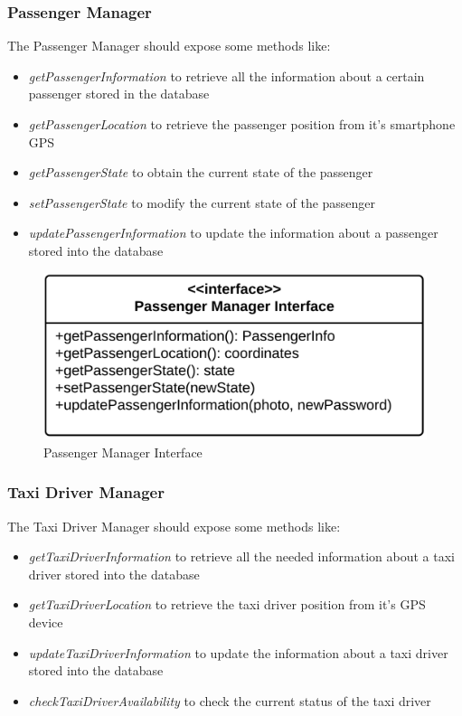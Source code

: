 \subsubsection{Passenger Manager}
The Passenger Manager should expose some methods like:
\begin{itemize}
	\item \textit{getPassengerInformation} to retrieve all the information about a certain passenger stored in the database
	\item \textit{getPassengerLocation} to retrieve the passenger position from it's smartphone GPS
	\item \textit{getPassengerState} to obtain the current state of the passenger
	\item \textit{setPassengerState} to modify the current state of the passenger
	\item \textit{updatePassengerInformation} to update the information about a passenger stored into the database
\end{itemize}

\begin{figure}[htbp]
\centering
\includegraphics[width=\textwidth]{cpt/img/ComponentInterfacesPassengerManagerInterface}
\caption{Passenger Manager Interface}
\end{figure}
\clearpage

\subsubsection{Taxi Driver Manager}
The Taxi Driver Manager should expose some methods like:
\begin{itemize}
	\item \textit{getTaxiDriverInformation} to retrieve all the needed information about a taxi driver stored into the database
	\item \textit{getTaxiDriverLocation} to retrieve the taxi driver position from it's GPS device
	\item \textit{updateTaxiDriverInformation} to update the information about a taxi driver stored into the database
	\item \textit{checkTaxiDriverAvailability} to check the current status of the taxi driver
\end{itemize}

